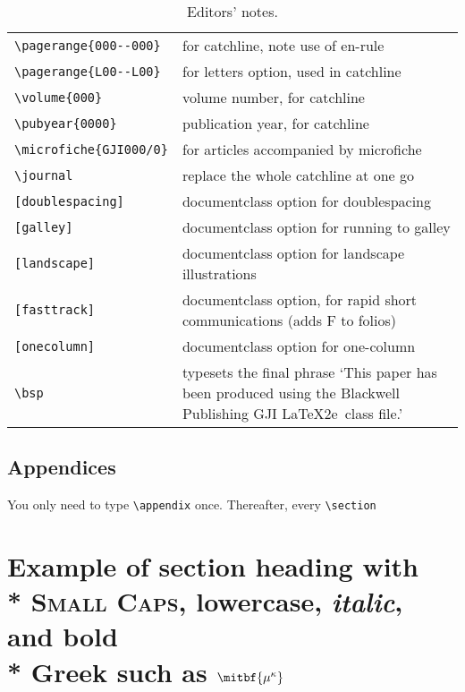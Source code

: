 \begin{table*}
\begin{minipage}{130mm}
\caption{Editors' notes.}\label{editors}
\begin{tabular}{@{}lp{270pt}}
\verb"\pagerange{000--000}"& for catchline, note use of en-rule\\
\verb"\pagerange{L00--L00}"& for letters option, used in catchline\\
\verb"\volume{000}" & volume number, for catchline\\
\verb"\pubyear{0000}" & publication year, for catchline\\
\verb"\microfiche{GJI000/0}" & for articles accompanied by microfiche\\
\verb"\journal" & replace the whole catchline at one go\\
\verb"[doublespacing]" & documentclass option for doublespacing\\
\verb"[galley]" & documentclass option for running to galley\\
\verb"[landscape]" & documentclass option for landscape illustrations\\
\verb"[fasttrack]" & documentclass option, for rapid short communications
                   (adds F to folios)\\
\verb"[onecolumn]" & documentclass option for one-column \\
\verb"\bsp"& typesets the final phrase `This paper has been produced
 using the Blackwell Publishing GJI \LaTeX2e\ class file.'\\
\end{tabular}
\end{minipage}
\end{table*}

\subsection{Appendices}

You only need to type \verb"\appendix" once. Thereafter, every \verb"\section"

\section[]{Example of section heading with\\*
  {\mdseries \textsc{S}\lowercase{\textsc{mall}}
  \textsc{C}\lowercase{\textsc{aps}}},
  \lowercase{lowercase},
  \textit{italic}, and bold\\* Greek such as
  $\mitbf{{\mu^\kappa}}$}\label{headings}

